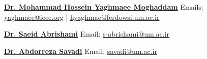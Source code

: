 \documentclass[10pt,a4paper,sans]{moderncv}        %
\begin{document}
\setlength{\columnsep}{+2cm}
\begin{multicols}{2}
	
\cvitem{} {\href{https://scholar.google.com/citations?hl=en&user=ZZrN9q8AAAAJ}{\textbf{Dr. Mohammad Hossein Yaghmaee Moghaddam}}}
\cvitem{} {Emails: \href{mailto:yaghmaee@ieee.org}{yaghmaee@ieee.org} | \href{mailto:hyaghmae@ferdowsi.um.ac.ir}{hyaghmae@ferdowsi.um.ac.ir}}


\cvitem{} {\href{https://scholar.google.com/citations?hl=en&user=lWYGNMAAAAAJ}{\textbf{Dr. Saeid Abrishami}}}
\cvitem{} {Email: \href{mailto:s-abrishami@um.ac.ir}{s-abrishami@um.ac.ir}}


\end{multicols}
\cvitem{} {\href{https://scholar.google.com/citations?user=GeJiC9QAAAAJ}{\textbf{Dr. Abdorreza Savadi}}}
\cvitem{} {Email: \href{mailto:savadi@um.ac.ir}{savadi@um.ac.ir}}



\end{document}
